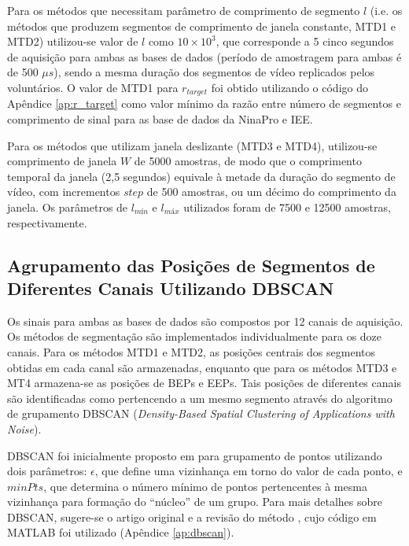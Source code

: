 Para os métodos que necessitam parâmetro de comprimento de segmento $l$ (i.e. os métodos que produzem segmentos de comprimento de janela constante, MTD1 e MTD2) utilizou-se valor de $l$ como $10 \times 10^3$, que corresponde a 5 cinco segundos de aquisição para ambas as bases de dados (período de amostragem para ambas é de 500 $\mu s$), sendo a mesma duração dos segmentos de vídeo replicados pelos voluntários. O valor de MTD1 para $r_{target}$ foi obtido utilizando o código do Apêndice \ref{ap:r_target} como valor mínimo da razão entre número de segmentos e comprimento de sinal para as base de dados da NinaPro e IEE.

Para os métodos que utilizam janela deslizante (MTD3 e MTD4), utilizou-se comprimento de janela $W$ de 5000 amostras, de modo que o comprimento temporal da janela (2,5 segundos) equivale à metade da duração do segmento de vídeo, com incrementos $step$ de 500 amostras, ou um décimo do comprimento da janela. Os parâmetros de $l_{mín}$ e $l_{máx}$ utilizados foram de 7500 e 12500 amostras, respectivamente.

			\subsection{Agrupamento das Posições de Segmentos de Diferentes Canais Utilizando DBSCAN}
Os sinais para ambas as bases de dados são compostos por 12 canais de aquisição. Os métodos de segmentação são implementados individualmente para os doze canais. Para os métodos MTD1 e MTD2, as posições centrais dos segmentos obtidas em cada canal são armazenadas, enquanto que para os métodos MTD3 e MT4 armazena-se as posições de BEPs e EEPs. Tais posições de diferentes canais são identificadas como pertencendo a um mesmo segmento através do algoritmo de grupamento DBSCAN (\emph{Density-Based Spatial Clustering of Applications with Noise}).

DBSCAN foi inicialmente proposto em \cite{Ester1996} para grupamento de pontos utilizando dois parâmetros: $\epsilon$, que define uma vizinhança em torno do valor de cada ponto, e $minPts$, que determina o número mínimo de pontos pertencentes à mesma vizinhança para formação do ``núcleo'' de um grupo. Para mais detalhes sobre DBSCAN, sugere-se o artigo original \cite{Ester1996} e a revisão do método \cite{Thanh2013}, cujo código em MATLAB foi utilizado (Apêndice \ref{ap:dbscan}).

